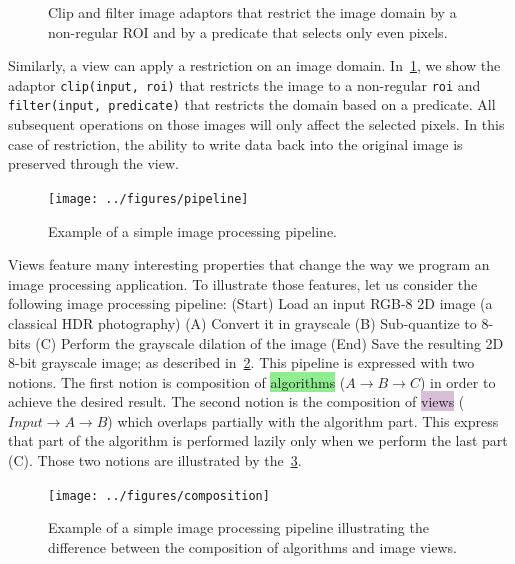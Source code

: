 \begin{figure}[htbp]
  \centering
  \hfil

  \caption{Clip and filter image adaptors that restrict the image domain by a non-regular ROI and by a predicate that
    selects only even pixels.}
  \label{fig.view.clip}
\end{figure}

Similarly, a view can apply a restriction on an image domain. In~\cref{fig.view.clip}, we show the adaptor
\texttt{clip(input, roi)} that restricts the image to a non-regular \texttt{roi} and \texttt{filter(input, predicate)}
that restricts the domain based on a predicate. All subsequent operations on those images will only affect the selected
pixels. In this case of restriction, the ability to write data back into the original image is preserved through the
view.

\begin{figure}[htbp]
  \centering
  \texttt{[image: ../figures/pipeline]}
  \caption{Example of a simple image processing pipeline.}
  \label{fig.view.pipeline}
\end{figure}

Views feature many interesting properties that change the way we program an image processing application. To illustrate
those features, let us consider the following image processing pipeline: (Start) Load an input RGB-8 2D image (a
classical HDR photography) (A) Convert it in grayscale (B) Sub-quantize to 8-bits (C) Perform the grayscale dilation of
the image (End) Save the resulting 2D 8-bit grayscale image; as described in~\cref{fig.view.pipeline}. This pipeline is
expressed with two notions. The first notion is composition of \colorbox{lightgreen}{algorithms} (\(A \rightarrow B
\rightarrow C\)) in order to achieve the desired result. The second notion is the composition of
\colorbox{thistle}{views} (\(Input \rightarrow A \rightarrow B\)) which overlaps partially with the algorithm part. This
express that part of the algorithm is performed lazily only when we perform the last part (C). Those two notions are
illustrated by the~\cref{fig.view.comp}.

\begin{figure}[htbp]
  \centering
  \texttt{[image: ../figures/composition]}
  \caption{Example of a simple image processing pipeline illustrating the difference between the composition of
    algorithms and image views.}
  \label{fig.view.comp}
\end{figure}

